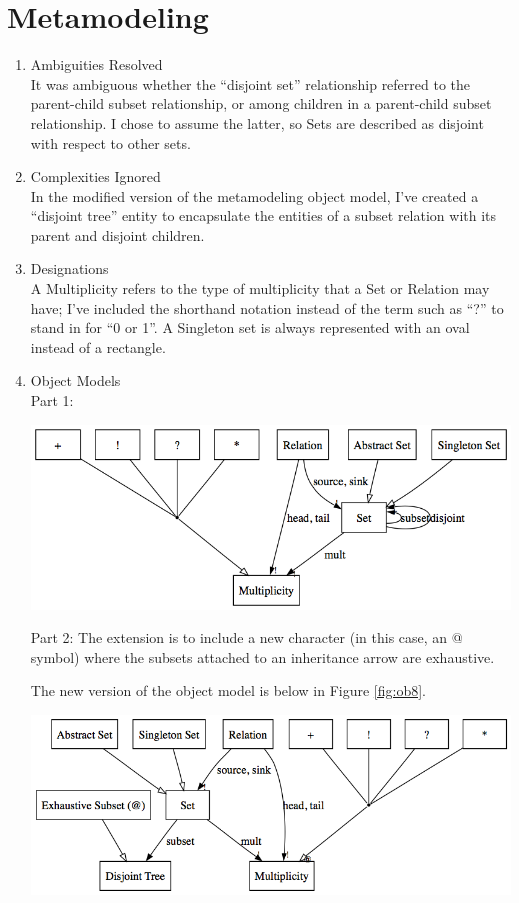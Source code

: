 \documentclass[11pt,letterpaper]{article}
\begin{document}
\section{Metamodeling}
\begin{enumerate}
\item Ambiguities Resolved\\
It was ambiguous whether the ``disjoint set'' relationship referred to the parent-child subset relationship, or among children in a parent-child subset relationship. I chose to assume the latter, so Sets are described as disjoint with respect to other sets.

\item Complexities Ignored\\
In the modified version of the metamodeling object model, I've created a ``disjoint tree'' entity to encapsulate the entities of a subset relation with its parent and disjoint children.
\item Designations\\
A Multiplicity refers to the type of multiplicity that a Set or Relation may have; I've included the shorthand notation instead of the term such as ``?'' to stand in for ``0 or 1''.
A Singleton set is always represented with an oval instead of a rectangle.
\item Object Models\\
Part 1:
\begin{center}
\includegraphics[width=400pt]{dot/metamodeling.png}
\label{fig:ob7} 
\end{center}

Part 2:
The extension is to include a new character (in this case, an @ symbol) where the subsets attached to an inheritance arrow are exhaustive.

The new version of the object model is below in Figure \ref{fig:ob8}.

\begin{center}
\includegraphics[width=400pt]{dot/metamodeling2.png}
\label{fig:ob8} 
\end{center}


\end{enumerate}
\end{document}
